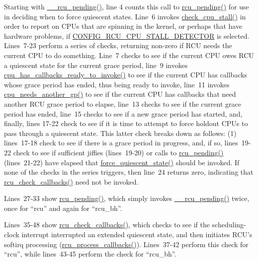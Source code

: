 Starting with \url{__rcu_pending()}, line 4 counts this call to
\url{rcu_pending()} for use in deciding when to force quiescent states.
Line~6 invokes \url{check_cpu_stall()} in order to report on CPUs
that are spinning in the kernel, or perhaps that have hardware problems,
if \url{CONFIG_RCU_CPU_STALL_DETECTOR} is selected.
Lines~7-23 perform a series of checks, returning non-zero if RCU
needs the current CPU to do something.
Line~7 checks to see if the current CPU owes RCU a quiescent state for the
current grace period,
line~9 invokes \url{cpu_has_callbacks_ready_to_invoke()} to see if
the current CPU has callbacks whose grace period has ended, thus being
ready to invoke,
line~11 invokes \url{cpu_needs_another_gp()} to see if the current
CPU has callbacks that need another RCU grace period to elapse,
line~13 checks to see if the current grace period has ended,
line~15 checks to see if a new grace period has started,
and, finally, lines 17-22 check to see if it is time to attempt
to force holdout CPUs to pass through a quiescent state.
This latter check breaks down as follows: (1) lines~17-18 check to see
if there is a grace period in progress, and, if so, lines~19-22
check to see if sufficient jiffies (lines~19-20) or calls to
\url{rcu_pending()} (lines~21-22) have elapsed that
\url{force_quiescent_state()} should be invoked.
If none of the checks in the series triggers, then line~24 returns
zero, indicating that \url{rcu_check_callbacks()} need not be invoked.

Lines~27-33 show \url{rcu_pending()}, which simply invokes
\url{__rcu_pending()} twice, once for ``rcu'' and again for
``rcu\_bh''.

 \QuickQuizEnd

Lines~35-48 show \url{rcu_check_callbacks()}, which checks to see
if the scheduling-clock interrupt interrupted an extended quiescent
state, and then initiates RCU's softirq processing
(\url{rcu_process_callbacks()}).
Lines~37-42 perform this check for ``rcu'', while lines~43-45
perform the check for ``rcu\_bh''.

